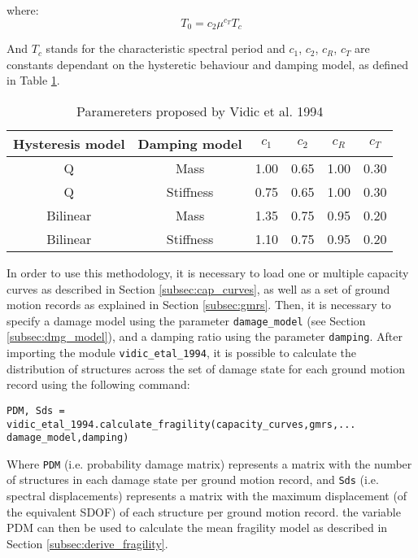 where: 
\begin{equation}
T_0 = c_2\mu^{c_T}T_c
\end{equation} 

And $T_c$ stands for the characteristic spectral period and $c_1$, $c_2$, $c_R$, $c_T$ are constants dependant on the hysteretic behaviour and damping model, as defined in Table \ref{table:VidicEtAl}.

\begin {table}
\caption{Paramereters proposed by Vidic et al. 1994} 
\label{table:VidicEtAl} 
\begin{center}
  \begin{tabular}{ | c | c | c | c | c | c |}
    \hline
    Hysteresis model & Damping model & $c_1$ & $c_2$ & $c_R$ & $c_T$ \\ \hline
    Q & Mass & 1.00 & 0.65 & 1.00 & 0.30 \\ \hline
    Q & Stiffness & 0.75 & 0.65 & 1.00 & 0.30 \\ \hline
    Bilinear & Mass & 1.35 & 0.75 & 0.95 & 0.20 \\ \hline
    Bilinear & Stiffness & 1.10 & 0.75 & 0.95 & 0.20 \\ \hline
  \end{tabular}
\end{center}
\end{table}

In order to use this methodology, it is necessary to load one or multiple capacity curves as described in Section \ref{subsec:cap_curves}, as well as a set of ground motion records as explained in Section \ref{subsec:gmrs}. Then, it is necessary to specify a damage model using the parameter \verb=damage_model= (see Section \ref{subsec:dmg_model}), and a damping ratio using the parameter \verb=damping=. After importing the module \verb=vidic_etal_1994=, it is possible to calculate the distribution of structures across the set of damage state for each ground motion record using the following command:

\begin{Verbatim}[frame=single, commandchars=\\\{\}, samepage=true]
PDM, Sds = vidic_etal_1994.calculate_fragility(capacity_curves,gmrs,...
damage_model,damping)
\end{Verbatim}

Where \verb=PDM= (i.e. probability damage matrix) represents a matrix with the number of structures in each damage state per ground motion record, and \verb=Sds= (i.e. spectral displacements) represents a matrix with the maximum displacement (of the equivalent SDOF) of each structure per ground motion record. the variable PDM can then be used to calculate the mean fragility model as described in Section \ref{subsec:derive_fragility}.



